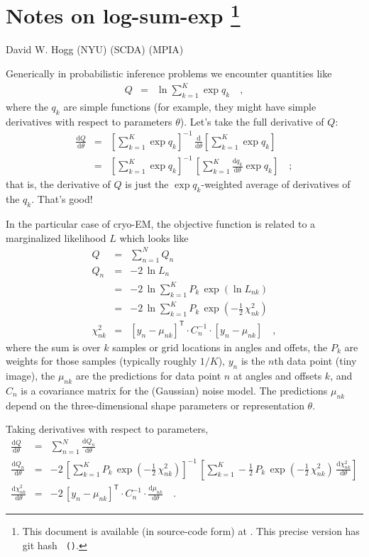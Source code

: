 \documentclass[12pt]{article}
\newcommand{\like}{L}
\newcommand{\dd}{\mathrm{d}}
\newcommand{\inverse}{^{-1}}
\newcommand{\transpose}{^{\mathsf{T}}}
\begin{document}
\section*{Notes on log-sum-exp%
\footnote{\raggedright This document is available (in source-code form) at \giturl.
This precise version has git hash \texttt{\githash~(\gitdate)}.}}
\noindent
David W. Hogg (NYU) (SCDA) (MPIA)

\bigskip

Generically in probabilistic inference problems we encounter quantities like
\begin{eqnarray}
  Q
  &=& \ln\sum_{k=1}^K\exp q_k
  \quad,
\end{eqnarray}
where the $q_k$ are simple functions (for example, they might have simple
derivatives with respect to parameters $\theta$).
Let's take the full derivative of $Q$:
\begin{eqnarray}
  \frac{\dd Q}{\dd\theta}
  &=& \left[\sum_{k=1}^K\exp q_k\right]\inverse
      \,\frac{\dd}{\dd\theta}\left[\sum_{k=1}^K\exp q_k\right] \\
  &=& \left[\sum_{k=1}^K\exp q_k\right]\inverse
      \,\left[\sum_{k=1}^K\frac{\dd q_k}{\dd\theta}\exp q_k\right]
  \quad;
\end{eqnarray}
that is, the derivative of $Q$ is just the $\exp q_k$-weighted average
of derivatives of the $q_k$.
That's good!

In the particular case of cryo-EM, the objective function is related
to a marginalized likelihood $\like$ which looks like
\begin{eqnarray}
  Q
  &=&
  \sum_{n=1}^N Q_n \\
  Q_n
  &=& -2\,\ln\like_n \\
  &=& -2\,\ln\sum_{k=1}^K P_k\,\exp(\ln\like_{nk}) \\
  &=& -2\,\ln\sum_{k=1}^K P_k\,\exp(-\frac{1}{2}\,\chi^2_{nk}) \\
  \chi^2_{nk}
  &=& [y_n - \mu_{nk}]\transpose\cdot C_n\inverse\cdot [y_n - \mu_{nk}]
  \quad,
\end{eqnarray}
where the sum is over $k$ samples or grid locations in angles and
offets, the $P_k$ are weights for those samples (typically roughly
$1/K$), $y_n$ is the $n$th data point (tiny image), the $\mu_{nk}$ are
the predictions for data point $n$ at angles and offsets $k$, and
$C_n$ is a covariance matrix for the (Gaussian) noise model.
The predictions $\mu_{nk}$ depend on the three-dimensional shape
parameters or representation $\theta$.

Taking derivatives with respect to parameters,
\begin{eqnarray}
  \frac{\dd Q}{\dd\theta}
  &=&
  \sum_{n=1}^N \frac{\dd Q_n}{\dd\theta} \\
  \frac{\dd Q_n}{\dd\theta}
  &=& -2\,\left[\sum_{k=1}^K P_k\,\exp(-\frac{1}{2}\,\chi^2_{nk})\right]\inverse
        \,\left[\sum_{k=1}^K -\frac{1}{2}\,P_k\,\exp(-\frac{1}{2}\,\chi^2_{nk})\,\frac{\dd\chi^2_{nk}}{\dd\theta}\right] \\
  \frac{\dd\chi^2_{nk}}{\dd\theta}
  &=& -2\,[y_n - \mu_{nk}]\transpose\cdot C_n\inverse\cdot\frac{\dd\mu_{nk}}{\dd\theta}
  \quad.
\end{eqnarray}
\end{document}
